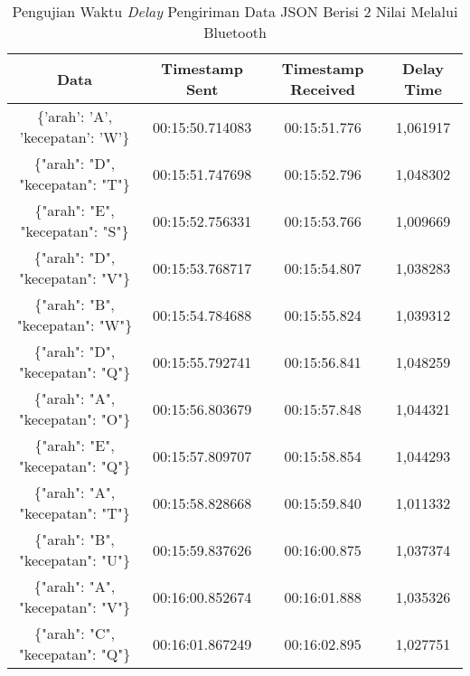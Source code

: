 \begin{longtable}{|ccc|c|}
  \caption{Pengujian Waktu \emph{Delay} Pengiriman Data JSON Berisi 2 Nilai Melalui Bluetooth}
  \label{tbl:delayBluetoothJSON2}\\
  \hline
  \multicolumn{1}{|c|}{Data}                              & \multicolumn{1}{c|}{Timestamp Sent}  & Timestamp Received & Delay Time  \\ \hline
  \endfirsthead
  \endhead
  \multicolumn{1}{|c|}{\{'arah': 'A', 'kecepatan': 'W'\}} & \multicolumn{1}{c|}{00:15:50.714083} & 00:15:51.776       & 1,061917    \\ \hline
  \multicolumn{1}{|c|}{\{"arah": "D", "kecepatan": "T"\}} & \multicolumn{1}{c|}{00:15:51.747698} & 00:15:52.796       & 1,048302    \\ \hline
  \multicolumn{1}{|c|}{\{"arah": "E", "kecepatan": "S"\}} & \multicolumn{1}{c|}{00:15:52.756331} & 00:15:53.766       & 1,009669    \\ \hline
  \multicolumn{1}{|c|}{\{"arah": "D", "kecepatan": "V"\}} & \multicolumn{1}{c|}{00:15:53.768717} & 00:15:54.807       & 1,038283    \\ \hline
  \multicolumn{1}{|c|}{\{"arah": "B", "kecepatan": "W"\}} & \multicolumn{1}{c|}{00:15:54.784688} & 00:15:55.824       & 1,039312    \\ \hline
  \multicolumn{1}{|c|}{\{"arah": "D", "kecepatan": "Q"\}} & \multicolumn{1}{c|}{00:15:55.792741} & 00:15:56.841       & 1,048259    \\ \hline
  \multicolumn{1}{|c|}{\{"arah": "A", "kecepatan": "O"\}} & \multicolumn{1}{c|}{00:15:56.803679} & 00:15:57.848       & 1,044321    \\ \hline
  \multicolumn{1}{|c|}{\{"arah": "E", "kecepatan": "Q"\}} & \multicolumn{1}{c|}{00:15:57.809707} & 00:15:58.854       & 1,044293    \\ \hline
  \multicolumn{1}{|c|}{\{"arah": "A", "kecepatan": "T"\}} & \multicolumn{1}{c|}{00:15:58.828668} & 00:15:59.840       & 1,011332    \\ \hline
  \multicolumn{1}{|c|}{\{"arah": "B", "kecepatan": "U"\}} & \multicolumn{1}{c|}{00:15:59.837626} & 00:16:00.875       & 1,037374    \\ \hline
  \multicolumn{1}{|c|}{\{"arah": "A", "kecepatan": "V"\}} & \multicolumn{1}{c|}{00:16:00.852674} & 00:16:01.888       & 1,035326    \\ \hline
  \multicolumn{1}{|c|}{\{"arah": "C", "kecepatan": "Q"\}} & \multicolumn{1}{c|}{00:16:01.867249} & 00:16:02.895       & 1,027751    \\ \hline

\end{longtable}
